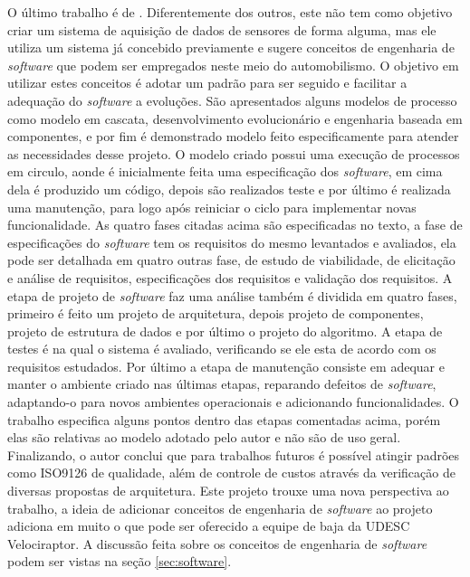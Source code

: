 O último trabalho é de . Diferentemente dos outros, este não tem como objetivo criar um sistema de aquisição de dados de sensores de forma alguma, mas ele utiliza um sistema já concebido previamente e sugere conceitos de engenharia de \textit{software} que podem ser empregados neste meio do automobilismo. O objetivo em utilizar estes conceitos é adotar um padrão para ser seguido e facilitar a adequação do \textit{software} a evoluções. São apresentados alguns modelos de processo como modelo em cascata, desenvolvimento evolucionário e engenharia baseada em componentes, e por fim é demonstrado modelo feito especificamente para atender as necessidades desse projeto. O modelo criado possui uma execução de processos em circulo, aonde é inicialmente feita uma especificação dos \textit{software}, em cima dela é produzido um código, depois são realizados teste e por último é realizada uma manutenção, para logo após reiniciar o ciclo para implementar novas funcionalidade. As quatro fases citadas acima são especificadas no texto, a fase de especificações do \textit{software} tem os requisitos do mesmo levantados e avaliados, ela pode ser detalhada em quatro outras fase, de estudo de viabilidade, de elicitação e análise de requisitos, especificações dos requisitos e validação dos requisitos. A etapa de projeto de \textit{software} faz uma análise também é dividida em quatro fases, primeiro é feito um projeto de arquitetura, depois projeto de componentes, projeto de estrutura de dados e por último o projeto do algoritmo. A etapa de testes é na qual o sistema é avaliado, verificando se ele esta de acordo com os requisitos estudados. Por último a etapa de manutenção consiste em adequar e manter o ambiente criado nas últimas etapas, reparando defeitos de \textit{software}, adaptando-o para novos ambientes operacionais e adicionando funcionalidades. O trabalho especifica alguns pontos dentro das etapas comentadas acima, porém elas são relativas ao modelo adotado pelo autor e não são de uso geral. Finalizando, o autor conclui que para trabalhos futuros é possível atingir padrões como ISO9126 de qualidade, além de controle de custos através da verificação de diversas propostas de arquitetura. Este projeto trouxe uma nova perspectiva ao trabalho, a ideia de adicionar conceitos de engenharia de \textit{software} ao projeto adiciona em muito o que pode ser oferecido a equipe de baja da UDESC Velociraptor. A discussão feita sobre os conceitos de engenharia de \textit{software} podem ser vistas na seção \ref{sec:software}. 
